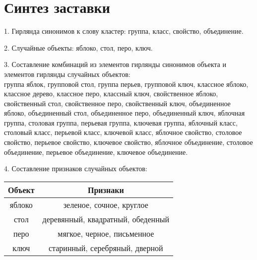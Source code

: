\chapter{Синтез заставки}
1. Гирлянда синонимов к слову кластер: группа, класс, свойство, объединение.

2. Случайные объекты: яблоко, стол, перо, ключ.

3. Составление комбинаций из элементов гирлянды синонимов объекта и элементов
гирлянды случайных объектов:\\
группа яблок, групповой стол, группа перьев, групповой ключ, классное яблоко,
классное дерево, классное перо, классный ключ, свойственное яблоко,
свойственный стол, свойственное перо, свойственный ключ, объединенное яблоко,
объединенный стол, объединенное перо, объединенный ключ, яблочная группа,
столовая группа, перьевая группа, ключевая группа, яблочный класс,
столовый класс, перьевой класс, ключевой класс, яблочное свойство,
столовое свойство, перьевое свойство, ключевое свойство, яблочное объединение,
столовое объединение, перьевое объединение, ключевое объединение.

4. Составление признаков случайных объектов:
\begin{table}[h!]
    \centering
    \small
    \begin{tabular}{|C{.15}|C{.6}|} \hline
        Объект & Признаки \\ \hline
        яблоко & зеленое, сочное, круглое \\ \hline
        стол   & деревянный, квадратный, обеденный \\ \hline
        перо   & мягкое, черное, письменное \\ \hline
        ключ   & старинный, серебряный, дверной \\ \hline
    \end{tabular}
\end{table}


